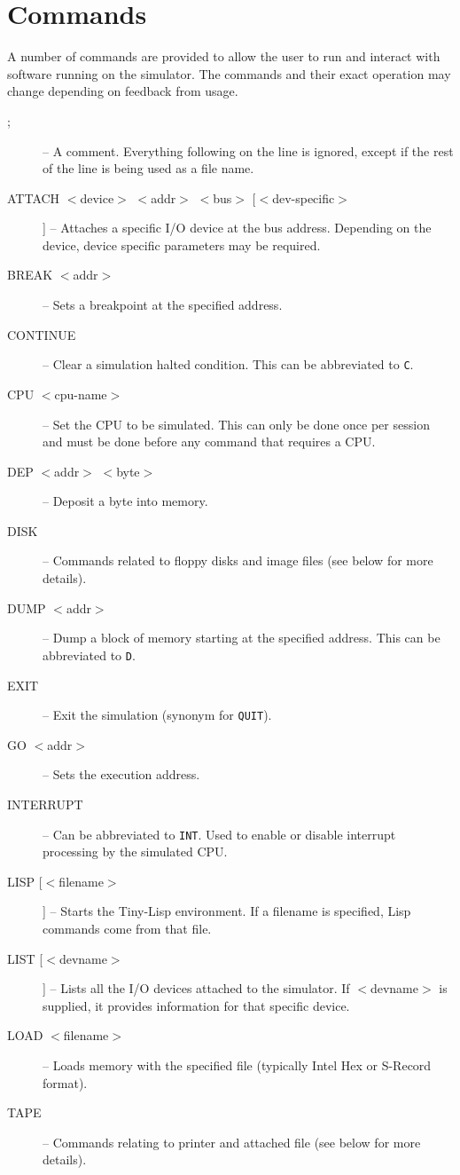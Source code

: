 \documentclass[10pt, openany]{book}
\begin{document}
\section{Commands}
A number of commands are provided to allow the user to run and interact with software running on the simulator.  The commands and their exact operation may change depending on feedback from usage.
\begin{description}
  \item[;] -- A comment.  Everything following on the line is ignored, except if the rest of the line is being used as a file name.
  \item[ATTACH $<$device$>$ $<$addr$>$ $<$bus$>$ [$<$dev-specific$>$]] --  Attaches a specific I/O device at the bus address.  Depending on the device, device specific parameters may be required.
  \item[BREAK $<$addr$>$] -- Sets a breakpoint at the specified address.
  \item[CONTINUE] -- Clear a simulation halted condition.  This can be abbreviated to \verb|C|.
  \item[CPU $<$cpu-name$>$] -- Set the CPU to be simulated.  This can only be done once per session and must be done before any command that requires a CPU.
  \item[DEP $<$addr$>$ $<$byte$>$] -- Deposit a byte into memory.
  \item[DISK]  --  Commands related to floppy disks and image files (see below for more details).
  \item[DUMP $<$addr$>$] -- Dump a block of memory starting at the specified address.  This can be abbreviated to \verb|D|.
  \item[EXIT] -- Exit the simulation (synonym for \verb|QUIT|).
  \item[GO $<$addr$>$] -- Sets the execution address.
  \item[INTERRUPT]-- Can be abbreviated to \verb|INT|.  Used to enable or disable interrupt processing by the simulated CPU.
  \item[LISP [$<$filename$>$]] -- Starts the Tiny-Lisp environment.  If a filename is specified, Lisp commands come from that file.
  \item[LIST [$<$devname$>$]] -- Lists all the I/O devices attached to the simulator.  If $<$devname$>$ is supplied, it provides information for that specific device.
  \item[LOAD $<$filename$>$] -- Loads memory with the specified file (typically Intel Hex or S-Record format).
  \item[TAPE] -- Commands relating to printer and attached file (see below for more details).

\end{description}
\end{document}

